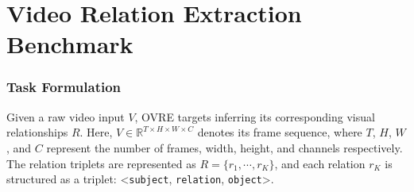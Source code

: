\documentclass[letterpaper]{article}
\begin{document}




\section{Video Relation Extraction Benchmark}
\subsubsection{Task Formulation}
Given a raw video input $V$, OVRE targets inferring its corresponding visual relationships $R$. Here, $V\in\mathbb{R}^{T\times H\times W\times C}$ denotes its frame sequence, where $T$, $H$, $W$, and $C$ represent the number of frames, width, height, and channels respectively. The relation triplets are represented as $R=\{{r_{1}},\cdots,{r_{K}}\}$, and each relation $r_{K}$ is structured as a triplet:  \textless \texttt{subject}, \texttt{relation}, \texttt{object}\textgreater.
\end{document}
